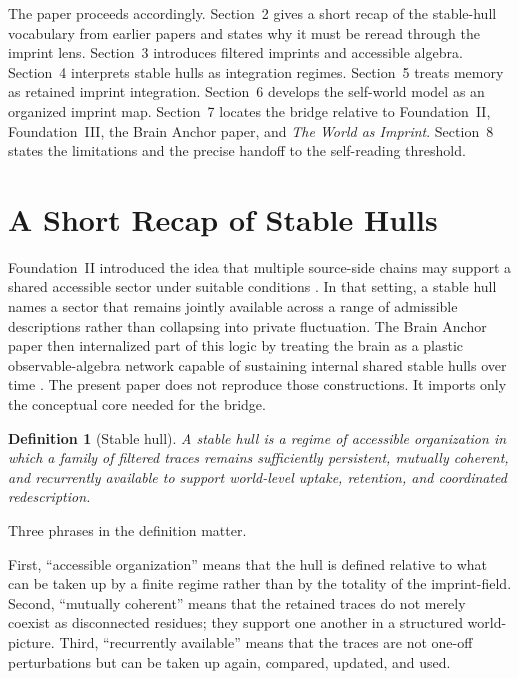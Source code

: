 \documentclass[12pt]{article}
\newtheorem{definition}{Definition}[section]
\begin{document}
The paper proceeds accordingly. Section~2 gives a short recap of the stable-hull vocabulary from earlier papers and states why it must be reread through the imprint lens. Section~3 introduces filtered imprints and accessible algebra. Section~4 interprets stable hulls as integration regimes. Section~5 treats memory as retained imprint integration. Section~6 develops the self-world model as an organized imprint map. Section~7 locates the bridge relative to Foundation~II, Foundation~III, the Brain Anchor paper, and \emph{The World as Imprint}. Section~8 states the limitations and the precise handoff to the self-reading threshold.

\section{A Short Recap of Stable Hulls}

Foundation~II introduced the idea that multiple source-side chains may support a shared accessible sector under suitable conditions \cite{FoundationII}. In that setting, a stable hull names a sector that remains jointly available across a range of admissible descriptions rather than collapsing into private fluctuation. The Brain Anchor paper then internalized part of this logic by treating the brain as a plastic observable-algebra network capable of sustaining internal shared stable hulls over time \cite{BrainAnchor}. The present paper does not reproduce those constructions. It imports only the conceptual core needed for the bridge.

\begin{definition}[Stable hull]
A \emph{stable hull} is a regime of accessible organization in which a family of filtered traces remains sufficiently persistent, mutually coherent, and recurrently available to support world-level uptake, retention, and coordinated redescription.
\end{definition}

Three phrases in the definition matter.

First, ``accessible organization'' means that the hull is defined relative to what can be taken up by a finite regime rather than by the totality of the imprint-field. Second, ``mutually coherent'' means that the retained traces do not merely coexist as disconnected residues; they support one another in a structured world-picture. Third, ``recurrently available'' means that the traces are not one-off perturbations but can be taken up again, compared, updated, and used.
\end{document}

